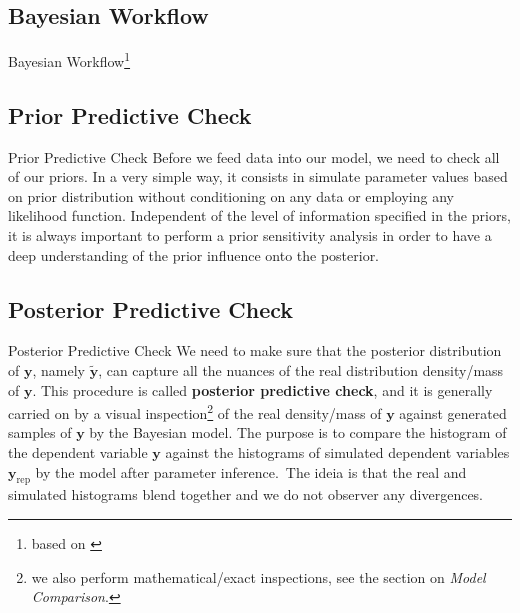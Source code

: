 \subsection{Bayesian Workflow}
\begin{frame}{Bayesian Workflow\footnote{based on \textcite{gelmanBayesianWorkflow2020}}}
	\centering
\end{frame}

\subsection{Prior Predictive Check}
\begin{frame}{Prior Predictive Check}
	Before we feed data into our model, 
	we need to check all of our priors.
	\vfill
	In a very simple way, it consists in simulate parameter values based on
	prior distribution without conditioning on any data or employing any
	likelihood function.
	\vfill
	Independent of the level of information specified in the priors,
	it is always important to perform a prior sensitivity analysis
	in order to have a deep understanding of the prior influence onto
	the posterior.
\end{frame}

\subsection{Posterior Predictive Check}
\begin{frame}{Posterior Predictive Check}
	We need to make sure that the posterior distribution of $\boldsymbol{y}$,
	namely $\boldsymbol{\tilde{y}}$,
	can capture all the nuances of the real distribution density/mass of $\boldsymbol{y}$.
	\vfill
	This procedure is called \textbf{posterior predictive check},
	and it is generally carried on by a visual inspection\footnote{
		we also perform mathematical/exact inspections,
		see the section on \textit{Model Comparison}.}
	of the real density/mass of $\boldsymbol{y}$ against generated samples
	of $\boldsymbol{y}$ by the Bayesian model.
	\vfill
	The purpose is to compare the histogram of the dependent variable $\boldsymbol{y}$
	against the histograms of simulated dependent variables $\boldsymbol{y}_{\text{rep}}$
	by the model after parameter inference.\
	The ideia is that the real and simulated histograms blend together and
	we do not observer any divergences.
\end{frame}

